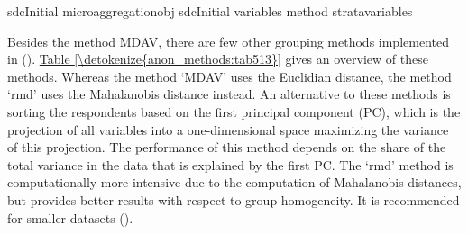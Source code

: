 \documentclass[letterpaper,10pt,english]{sphinxmanual}
\begin{document}
\def\sphinxLiteralBlockLabel{\label{\detokenize{anon_methods:code518}}}
%
\begin{sphinxVerbatim}[commandchars=\\\{\},numbers=left,firstnumber=1,stepnumber=1]
sdcInitial  microaggregationobj  sdcInitial
                               variables    
                               method   strata\PYGZus{}variables  
\end{sphinxVerbatim}

Besides the method MDAV, there are few other grouping methods
implemented in  ({\hyperref[\detokenize{anon_methods:temk14}]{}}). \hyperref[\detokenize{anon_methods:tab513}]{Table \ref{\detokenize{anon_methods:tab513}}}
gives an overview of these methods. Whereas the method ‘MDAV’ uses the
Euclidian distance, the method ‘rmd’ uses the Mahalanobis distance
instead. An alternative to these methods is sorting the respondents
based on the first principal component (PC), which is the projection of
all variables into a one-dimensional space maximizing the variance of
this projection. The performance of this method depends on the share of
the total variance in the data that is explained by the first PC. The
‘rmd’ method is computationally more intensive due to the computation of
Mahalanobis distances, but provides better results with respect to group
homogeneity. It is recommended for smaller datasets ({\hyperref[\detokenize{anon_methods:temk14}]{}}).
\end{document}
